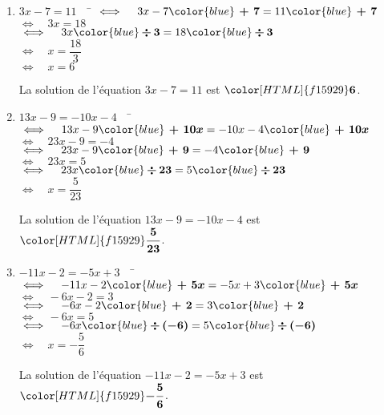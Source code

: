 \documentclass[a4paper,11pt,exos]{nsi} %
\begin{document}
\begin{enumerate}
    \item \begin{tabbing}
        $3x-7=11 \quad$ \= $\iff\quad 3x-7{\color{blue}\boldsymbol{\,\,+\,\,7}}=11{\color{blue}\boldsymbol{\,\,+\,\,7}}$\\
        \> $\iff\quad 3x=18$\\
        \>  $\iff\quad 3x{\color{blue}\boldsymbol{\,\div\,3}}=18{\color{blue}\boldsymbol{\,\div\,3}}$\\
        \>  $\iff\quad x=\dfrac{18}{3}$\\
        \>  $\iff\quad  x=6$
    \end{tabbing}
    La solution de l'équation $3x-7=11$ est ${\color[HTML]{f15929}\boldsymbol{6}}$.

\item \begin{tabbing}
    $13x-9=-10x-4\quad$ \= $\iff\quad 13x-9{\color{blue}\boldsymbol{\,\,+\,\,10x}}=-10x-4{\color{blue}\boldsymbol{\,\,+\,\,10x}}$\\
    \>  $\iff\quad 23x-9=-4$\\
    \>  $\iff\quad 23x-9{\color{blue}\boldsymbol{\,\,+\,\,9}}=-4{\color{blue}\boldsymbol{\,\,+\,\,9}}$\\
    \>  $\iff\quad 23x=5$\\
    \>  $\iff\quad 23x{\color{blue}\boldsymbol{\,\div\,23}}=5{\color{blue}\boldsymbol{\,\div\,23}}$\\
    \>  $\iff\quad x=\dfrac{5}{23}$
\end{tabbing}
La solution de l'équation $13x-9=-10x-4$ est ${\color[HTML]{f15929}\boldsymbol{\dfrac{5}{23}}}$.

\item \begin{tabbing}
    $-11x-2=-5x+3 \quad$    \=  $\iff\quad -11x-2{\color{blue}\boldsymbol{\,\,+\,\,5x}}=-5x+3{\color{blue}\boldsymbol{\,\,+\,\,5x}}$\\
    \>  $\iff\quad -6x-2=3$\\
    \>  $\iff\quad  -6x-2{\color{blue}\boldsymbol{\,\,+\,\,2}}=3{\color{blue}\boldsymbol{\,\,+\,\,2}}$\\
    \>  $\iff\quad -6x=5$\\
    \>  $\iff\quad -6x{\color{blue}\boldsymbol{\,\div\,(-6)}}=5{\color{blue}\boldsymbol{\,\div\,(-6)}}$\\
    \>  $\iff\quad x=-\dfrac{5}{6}$
\end{tabbing}
La solution de l'équation $-11x-2=-5x+3$ est ${\color[HTML]{f15929}\boldsymbol{-\dfrac{5}{6}}}$.
\end{enumerate}
\end{document}

